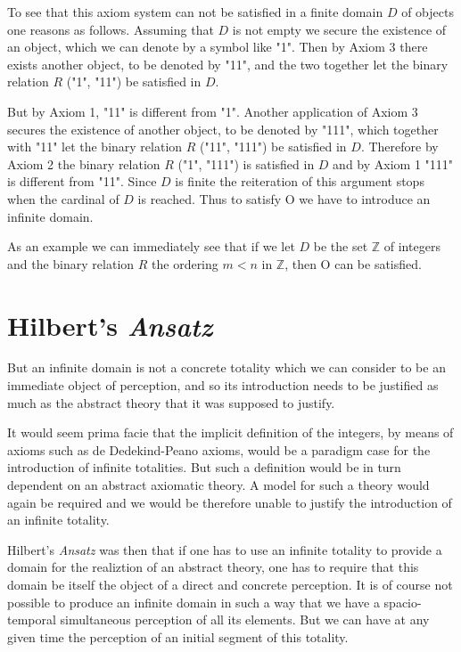 \documentclass[12pt]{article}
\begin{document}
To see that this axiom system can not be satisfied in a finite domain $D$ of objects one reasons as follows. Assuming  that $D$ is not empty we secure the existence of an object, which we can denote by a symbol like "1". Then by Axiom 3 there exists another object, to be denoted by "11", and the two together let the binary relation $R$ ("1", "11") be satisfied in $D$.

But by Axiom 1, "11" is different from "1". Another application of Axiom 3 secures the existence of another object, to be denoted by "111", which together with "11" let the binary relation $R$ ("11", "111") be satisfied in $D$. Therefore by Axiom 2 the binary relation $R$ ("1", "111") is satisfied in $D$ and by Axiom 1 "111" is different from "11". Since $D$ is finite the reiteration of this argument stops when the cardinal of $D$ is reached. Thus to satisfy O we have to introduce an infinite domain.

As an example we can immediately see that if we let $D$ be the set $\mathbb{Z}$ of integers and the binary relation $R$ the ordering $m < n$ in $\mathbb{Z}$, then O can be satisfied.

\section{Hilbert's \emph{Ansatz}}\normalsize

But an infinite domain is not a concrete totality which we can consider to be an immediate object of perception, and so its introduction needs to be justified as much as the abstract theory that it was supposed to justify.

It would seem prima facie that the implicit definition of the integers, by means of axioms such as de Dedekind-Peano axioms, would be a paradigm case for the introduction of infinite totalities. But such a definition would be in turn dependent on an abstract axiomatic theory. A model for such a theory would again be required and we would be therefore unable to justify the introduction of an infinite totality.

Hilbert's \emph{Ansatz} was then that if one has to use an infinite totality to provide a domain for the realiztion of  an abstract theory, one has to require that this domain be itself the object of a direct and concrete perception.
It is of course not possible to produce  an infinite domain in such a way that we have a spacio-temporal simultaneous perception of all its elements. But we can have at any given time the perception of an initial segment of this totality.
\end{document}
